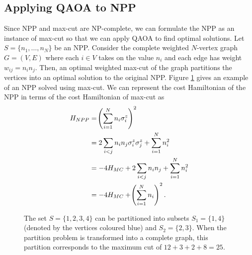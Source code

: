     \subsection{Applying QAOA to NPP}

    Since NPP and max-cut are NP-complete, we can formulate the NPP as an instance of max-cut so that we can apply QAOA to find optimal solutions. Let $S=\{n_1,\dots,n_N\}$ be an NPP. Consider the complete weighted $N$-vertex graph $G=(V,E)$ where each $i\in V$ takes on the value $n_i$ and each edge has weight $w_{ij} = n_in_j$. Then, an optimal weighted max-cut of the graph partitions the vertices into an optimal solution to the original NPP. Figure \ref{fig:number_maxcut} gives an example of an NPP solved using max-cut. We can represent the cost Hamiltonian of the NPP in terms of the cost Hamiltonian of max-cut as
    \begin{align} \label{eq:cost}
        H_{NPP} &= \lr(){\sum^N_{i=1}n_i\sigma_i^z}^2 \nonumber \\ 
        &= 2\sum_{i<j}n_in_j\sigma_i^z\sigma_j^z + \sum^N_{i=1}n_i^2  \nonumber\\ 
        &= -4H_{MC} + 2\sum_{i<j}n_in_j + \sum^N_{i=1}n_i^2  \nonumber \\ 
        &= -4H_{MC} + \lr(){\sum^N_{i=1}n_i}^2.
    \end{align}

    \begin{figure}
        \begin{center}
        \vspace{1cm}
        \end{center}
        \vspace{0.4cm}
        \caption{The set $S=\{1,2,3,4\}$ can be partitioned into subsets $S_1=\{1,4\}$ (denoted by the vertices coloured blue) and $S_2=\{2,3\}$. When the partition problem is transformed into a complete graph, this partition corresponds to the maximum cut of $12+3+2+8= 25$.}
        \label{fig:number_maxcut}
    \end{figure}

